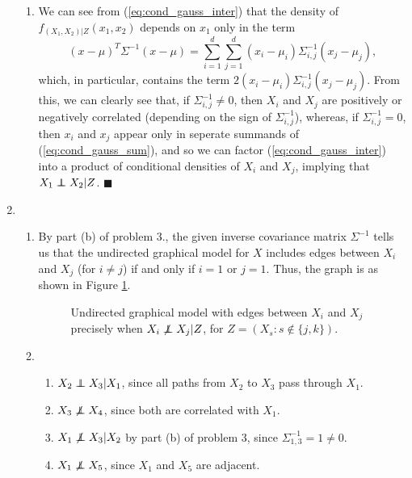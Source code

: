 \documentclass[11pt]{article}
\renewcommand{\qed}{\quad \ensuremath{\blacksquare}}
\newcommand{\inv}{^{-1}}
\newcommand\ind{\protect\mathpalette{\protect\independenT}{\perp}}
\def\independenT#1#2{\mathrel{\rlap{$#1#2$}\mkern2mu{#1#2}}}
\begin{document}
\begin{enumerate}
\begin{enumerate}
\item We can see from (\ref{eq:cond_gauss_inter}) that the density of
$f_{(X_1,X_2) | Z}(x_1,x_2)$ depends on $x_1$ only in the term
\begin{equation}
(x - \mu)^T \Sigma\inv (x - \mu)
    = \sum_{i = 1}^d \sum_{j = 1}^d (x_i - \mu_i)\Sigma\inv_{i,j}(x_j - \mu_j),
\label{eq:cond_gauss_sum}
\end{equation}
which, in particular, contains the term
$2(x_i - \mu_i)\Sigma\inv_{i,j}(x_j - \mu_j)$. From this, we can clearly see
that, if $\Sigma\inv_{i,j} \neq 0$, then $X_i$ and $X_j$ are positively or
negatively correlated (depending on the sign of $\Sigma\inv_{i,j}$), whereas,
if $\Sigma\inv_{i,j} = 0$, then $x_i$ and $x_j$ appear only in seperate
summands of (\ref{eq:cond_gauss_sum}), and so we can factor
(\ref{eq:cond_gauss_inter}) into a product of conditional densities of $X_i$
and $X_j$, implying that $X_1 \ind X_2 | Z$. \qed

\end{enumerate}

\newpage
\item
\begin{enumerate}
\item By part (b) of problem 3., the given inverse covariance matrix
$\Sigma\inv$ tells us that the undirected graphical model for $X$ includes
edges between $X_i$ and $X_j$ (for $i \neq j$) if and only if $i = 1$ or
$j = 1$. Thus, the graph is as shown in Figure \ref{fig:graph_model}.
\begin{figure}[h]
\centering
{}
\caption{Undirected graphical model with edges between $X_i$ and $X_j$
precisely when $X_i \not\ind X_j | Z$, for $Z = (X_s : s \notin\{j,k\})$.}
\label{fig:graph_model}
\end{figure}

\item
\begin{enumerate}
\item $X_2 \ind X_3 | X_1$, since all paths from $X_2$ to $X_3$ pass through
$X_1$.
\item $X_3 \not\ind X_4$, since both are correlated with $X_1$.
\item $X_1 \not\ind X_3 | X_2$ by part (b) of problem 3, since
$\Sigma\inv_{1,3} = 1 \neq 0$.
\item $X_1 \not\ind X_5$, since $X_1$ and $X_5$ are adjacent.
\end{enumerate}


\end{enumerate}
\end{enumerate}
\end{document}
